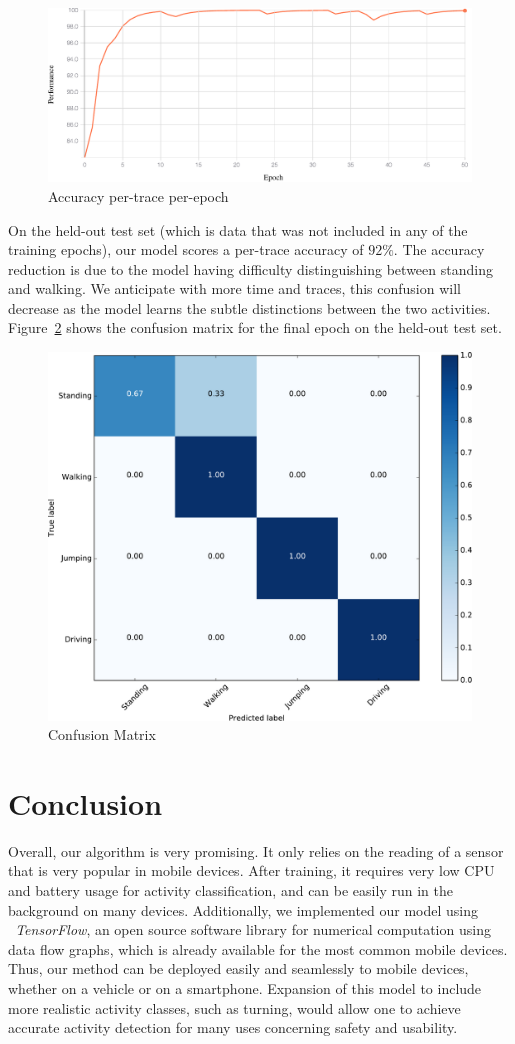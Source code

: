 \documentclass{article}
\begin{document}
\begin{figure}[h]
    \centering
    \includegraphics[width=\linewidth]{figures/performance_plot.pdf}
    \caption{Accuracy per-trace per-epoch \label{fig:acc_ptpe}}
\end{figure}

On the held-out test set (which is data that was not included in any of the training epochs), 
our model scores a per-trace accuracy of $92\%$. The accuracy reduction is due to the 
model having difficulty distinguishing between standing and walking. We anticipate with 
more time and traces, this confusion will decrease as the model learns the subtle distinctions 
between the two activities. Figure~\ref{fig:confusion} shows the confusion matrix for the 
final epoch on the held-out test set.

\begin{figure}[h]
    \centering
    \includegraphics[width=0.44\linewidth]{figures/confusion_matrix}
    \caption{Confusion Matrix \label{fig:confusion}}
\end{figure}

\section{Conclusion}
\vspace{-.3cm}
Overall, our algorithm is very promising. It only relies on the reading of a sensor that is very 
popular in mobile devices. After training, it requires very low CPU and battery usage for 
activity classification, and can be easily run in the background on many devices. 
Additionally, we implemented our model using \textit{\ TensorFlow}, an open source software 
library for numerical computation using data flow graphs, which is already available for the most
common mobile devices. Thus, our method can be deployed easily and seamlessly to mobile 
devices, whether on a vehicle or on a smartphone. Expansion of this model to include more 
realistic activity classes, such as turning, would allow one to achieve accurate activity 
detection for many uses concerning safety and usability.


{\scriptsize%

}
\end{document}
